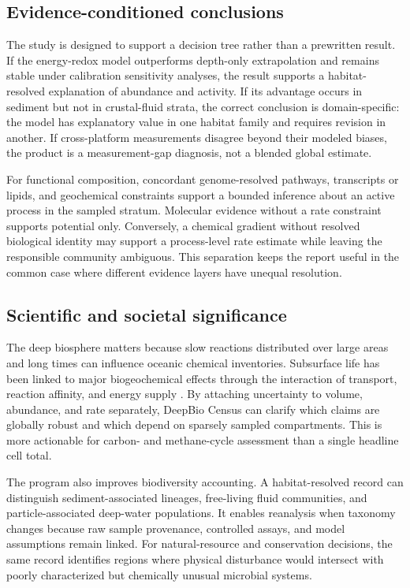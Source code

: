 \documentclass[conference]{../../../../Conference-LaTeX-template_10-17-19/IEEEtran}
\begin{document}
\subsection{Evidence-conditioned conclusions}
The study is designed to support a decision tree rather than a prewritten result. If the energy-redox model outperforms depth-only extrapolation and remains stable under calibration sensitivity analyses, the result supports a habitat-resolved explanation of abundance and activity. If its advantage occurs in sediment but not in crustal-fluid strata, the correct conclusion is domain-specific: the model has explanatory value in one habitat family and requires revision in another. If cross-platform measurements disagree beyond their modeled biases, the product is a measurement-gap diagnosis, not a blended global estimate.

For functional composition, concordant genome-resolved pathways, transcripts or lipids, and geochemical constraints support a bounded inference about an active process in the sampled stratum. Molecular evidence without a rate constraint supports potential only. Conversely, a chemical gradient without resolved biological identity may support a process-level rate estimate while leaving the responsible community ambiguous. This separation keeps the report useful in the common case where different evidence layers have unequal resolution.

\subsection{Scientific and societal significance}
The deep biosphere matters because slow reactions distributed over large areas and long times can influence oceanic chemical inventories. Subsurface life has been linked to major biogeochemical effects through the interaction of transport, reaction affinity, and energy supply \cite{dhondt2019}. By attaching uncertainty to volume, abundance, and rate separately, DeepBio Census can clarify which claims are globally robust and which depend on sparsely sampled compartments. This is more actionable for carbon- and methane-cycle assessment than a single headline cell total.

The program also improves biodiversity accounting. A habitat-resolved record can distinguish sediment-associated lineages, free-living fluid communities, and particle-associated deep-water populations. It enables reanalysis when taxonomy changes because raw sample provenance, controlled assays, and model assumptions remain linked. For natural-resource and conservation decisions, the same record identifies regions where physical disturbance would intersect with poorly characterized but chemically unusual microbial systems.
\end{document}
